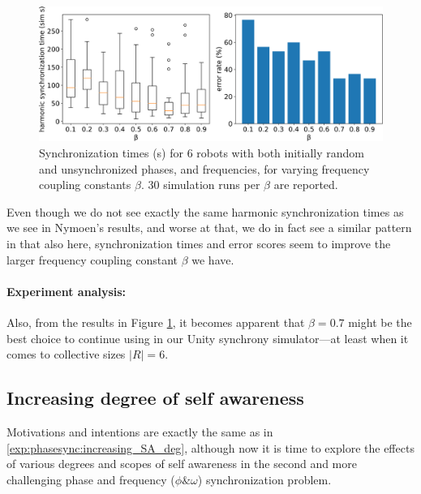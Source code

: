 		\begin{figure}[ht!]
			\centering
			\includegraphics[width=\linewidth]{Assets/DocSegments/Chapters/ExperimentsAndResults/Figures/PerfScores/baseline_reproducing_phase_and_freq_sync_for_beta.pdf}
			\caption[Experiment results for second $\phi$ \& $\omega$ synchronization baseline reproduction experiment.]{Synchronization times (s) for 6 robots with both initially random and unsynchronized phases, and frequencies, for varying frequency coupling constants $\beta$. 30 simulation runs per $\beta$ are reported.}
			\label{fig:baseline_reproducing_phase_and_freq_sync_for_beta}
		\end{figure}
		
		Even though we do not see exactly the same harmonic synchronization times as we see in Nymoen's results, and worse at that, we do in fact see a similar pattern in that also here, synchronization times and error scores seem to improve the larger frequency coupling constant $\beta$ we have.
		
		\paragraph{Experiment analysis:\nl}
		
		Also, from the results in Figure \ref{fig:baseline_reproducing_phase_and_freq_sync_for_beta}, it becomes apparent that $\beta=0.7$ might be the best choice to continue using in our Unity synchrony simulator—at least when it comes to collective sizes $|R|=6$.
		
	
	\subsection{Increasing degree of self awareness}
	\label{exp:phase_and_freq_sync:increasing_SA_deg}
	
	Motivations and intentions are exactly the same as in \ref{exp:phasesync:increasing_SA_deg}, although now it is time to explore the effects of various degrees and scopes of self awareness in the second and more challenging phase and frequency ($\phi \& \omega$) synchronization problem.
	
